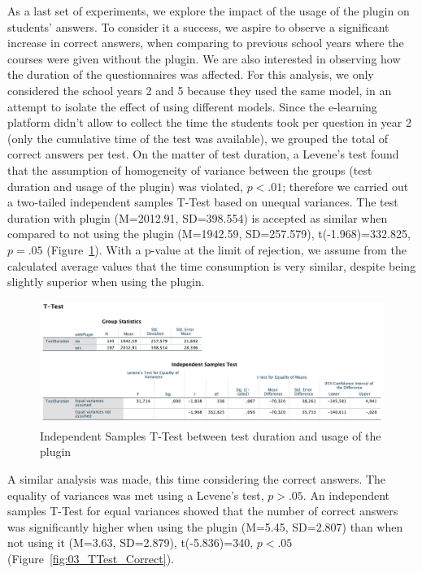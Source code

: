 As a last set of experiments, we explore the impact of the usage of the plugin on students' answers. To consider it a success, we aspire to observe a significant increase in correct answers, when comparing to previous school years where the courses were given without the plugin. We are also interested in observing how the duration of the questionnaires was affected.
For this analysis, we only considered the school years 2 and 5 because they used the same model, in an attempt to isolate the effect of using different models. Since the e-learning platform didn't allow to collect the time the students took per question in year 2 (only the cumulative time of the test was available), we grouped the total of correct answers per test. 
On the matter of test duration, a Levene's test found that the assumption of homogeneity of variance between the groups (test duration and usage of the plugin) was violated, $p<.01$; therefore we carried out a two-tailed independent samples T-Test based on unequal variances. The test duration with plugin (M=2012.91, SD=398.554) is accepted as similar when compared to not using the plugin (M=1942.59, SD=257.579), t(-1.968)=332.825, $p=.05$ (Figure~\ref{fig:03_TTest_Duration}). With a p-value at the limit of rejection, we assume from the calculated average values that the time consumption is very similar, despite being slightly superior when using the plugin.

\begin{figure}[ht]
\centering
\includegraphics[width=1\textwidth]{Template/Chapters/figures/6_Results/Section3/03_TTest_Duration.png}
\caption{Independent Samples T-Test between test duration and usage of the plugin}
\label{fig:03_TTest_Duration}
\end{figure}

A similar analysis was made, this time considering the correct answers. The equality of variances was met using a Levene’s test, $p>.05$. An independent samples T-Test for equal variances showed that the number of correct answers was significantly higher when using the plugin (M=5.45, SD=2.807) than when not using it (M=3.63, SD=2.879), t(-5.836)=340, $p<.05$ (Figure~\ref{fig:03_TTest_Correct}).


